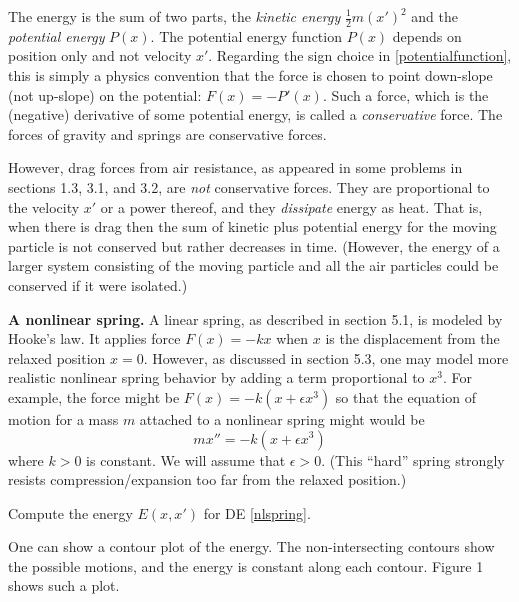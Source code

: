 \documentclass[12pt]{article}
\theoremstyle{definition}
\newcommand{\eps}{\epsilon}
\begin{document}
The energy is the sum of two parts, the \emph{kinetic energy} $\frac{1}{2} m (x')^2$ and the \emph{potential energy} $P(x)$.  The potential energy function $P(x)$ depends on position only and not velocity $x'$.  Regarding the sign choice in \eqref{potentialfunction}, this is simply a physics convention that the force is chosen to point down-slope (not up-slope) on the potential: $F(x)=-P'(x)$.  Such a force, which is the (negative) derivative of some potential energy, is called a \emph{conservative} force.  The forces of gravity and springs are conservative forces.

However, drag forces from air resistance, as appeared in some problems in sections 1.3, 3.1, and 3.2, are \emph{not} conservative forces.  They are proportional to the velocity $x'$ or a power thereof, and they \emph{dissipate} energy as heat.  That is, when there is drag then the sum of kinetic plus potential energy for the moving particle is not conserved but rather decreases in time.  (However, the energy of a larger system consisting of the moving particle and all the air particles could be conserved if it were isolated.)

\medskip
\textbf{A nonlinear spring.}  A linear spring, as described in section 5.1, is modeled by Hooke's law.  It applies force $F(x)=-kx$ when $x$ is the displacement from the relaxed position $x=0$.  However, as discussed in section 5.3, one may model more realistic nonlinear spring behavior by adding a term proportional to $x^3$.  For example, the force might be $F(x)=-k(x + \eps x^3)$ so that the equation of motion for a mass $m$ attached to a nonlinear spring might would be
\begin{equation}
m x'' = - k (x + \eps x^3) \label{nlspring}
\end{equation}
where $k>0$ is constant.  We will assume that $\eps>0$.  (This ``hard'' spring strongly resists compression/expansion too far from the relaxed position.)

\begin{exerpart}
Compute the energy $E(x,x')$ for DE \eqref{nlspring}.
\end{exerpart}

One can show a contour plot of the energy.  The non-intersecting contours show the possible motions, and the energy is constant along each contour.  Figure 1 shows such a plot.
\end{document}
